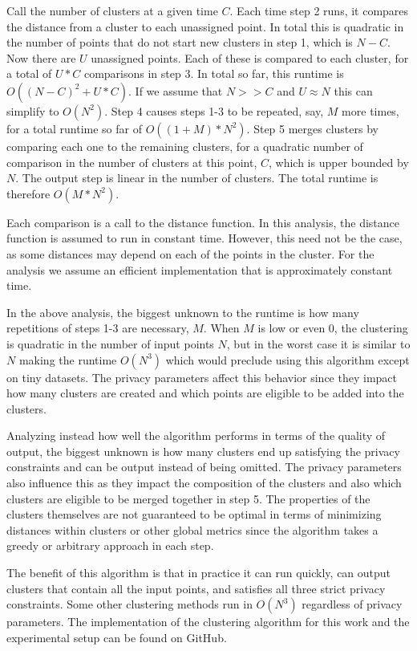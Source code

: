 Call the number of clusters at a given time $C$. Each time step 2 runs, it compares the distance from a cluster to each unassigned point. In total this is quadratic in the number of points that do not start new clusters in step 1, which is $N - C$. Now there are $U$ unassigned points. Each of these is compared to each cluster, for a total of $U*C$ comparisons in step 3. In total so far, this runtime is $O((N-C)^2 + U*C)$. If we assume that $N>>C$ and $U\approx N$ this can simplify to $O(N^2)$. Step 4 causes steps 1-3 to be repeated, say, $M$ more times, for a total runtime so far of $O((1+M)*N^2)$. Step 5 merges clusters by comparing each one to the remaining clusters, for a quadratic number of comparison in the number of clusters at this point, $C$, which is upper bounded by $N$. The output step is linear in the number of clusters. The total runtime is therefore $O(M*N^2)$.

Each comparison is a call to the distance function. In this analysis, the distance function is assumed to run in constant time. However, this need not be the case, as some distances may depend on each of the points in the cluster. For the analysis we assume an efficient implementation that is approximately constant time.

In the above analysis, the biggest unknown to the runtime is how many repetitions of steps 1-3 are necessary, $M$. When $M$ is low or even 0, the clustering is quadratic in the number of input points $N$, but in the worst case it is similar to $N$ making the runtime $O(N^3)$ which would preclude using this algorithm except on tiny datasets. The privacy parameters affect this behavior since they impact how many clusters are created and which points are eligible to be added into the clusters.

Analyzing instead how well the algorithm performs in terms of the quality of output, the biggest unknown is how many clusters end up satisfying the privacy constraints and can be output instead of being omitted. The privacy parameters also influence this as they impact the composition of the clusters and also which clusters are eligible to be merged together in step 5. The properties of the clusters themselves are not guaranteed to be optimal in terms of minimizing distances within clusters or other global metrics since the algorithm takes a greedy or arbitrary approach in each step.

The benefit of this algorithm is that in practice it can run quickly, can output clusters that contain all the input points, and satisfies all three strict privacy constraints. Some other clustering methods run in $O(N^3)$ regardless of privacy parameters. The implementation of the clustering algorithm for this work and the experimental setup can be found on GitHub\cite{lDiversityClusteringGithub}.

